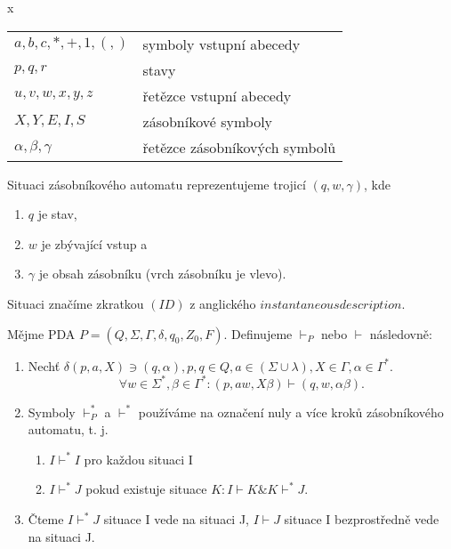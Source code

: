 \documentclass[../main.tex]{subfiles}
\begin{document}
    \begin{definition}
        {\color{white} x}

        \begin{tabular}{l l}
            $a,b,c,*,+,1,(,)$ & symboly vstupní abecedy\\
            $p,q,r$ & stavy \\
            $u,v,w,x,y,z$ & řetězce vstupní abecedy\\
            $X,Y,E,I,S$ & zásobníkové symboly\\
            $\alpha, \beta, \gamma$ & řetězce zásobníkových symbolů\\
        \end{tabular}
    \end{definition}

    \begin{definition}
        Situaci zásobníkového automatu reprezentujeme trojicí $(q,w,\gamma)$, kde
        \begin{enumerate}
            \item $q$ je stav,
            \item $w$ je zbývající vstup a 
            \item $\gamma$ je obsah zásobníku (vrch zásobníku je vlevo).
        \end{enumerate}
        Situaci značíme zkratkou $(ID)$ z anglického $instantaneous description$.
    \end{definition}

    \begin{definition}
        Mějme PDA $P = (Q,\Sigma, \Gamma, \delta, q_0, Z_0, F)$. Definujeme $\vdash_P$ nebo $\vdash$ následovně:
        \begin{enumerate}
            \item Nechť $\delta(p,a,X) \ni (q,\alpha), p, q \in Q, a \in (\Sigma \cup {\lambda}), X \in \Gamma, \alpha \in \Gamma^*$.
            \[\forall w \in \Sigma^*, \beta \in \Gamma^* : (p,aw, X\beta) \vdash (q,w, \alpha \beta).\]
            \item Symboly $\vdash^*_P$ a $\vdash^*$ používáme na označení nuly a více kroků zásobníkového automatu, t. j.
            \begin{enumerate}
                \item $I \vdash^* I$ pro každou situaci I
                \item $I \vdash^* J$ pokud existuje situace $K : I \vdash K \& K \vdash^* J$.
            \end{enumerate}
            \item Čteme $I \vdash^* J$ situace I vede na situaci J, $I \vdash J$ situace I bezprostředně vede na situaci J.
        \end{enumerate}
    \end{definition}
\end{document}
